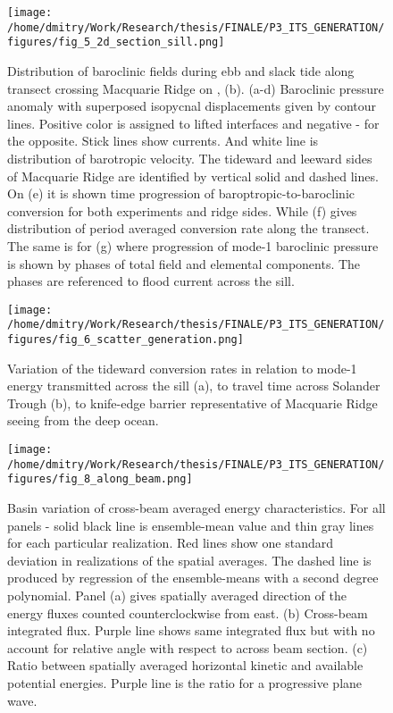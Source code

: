 \documentclass[12pt]{article}
\begin{document}
\begin{figure}
	\centering
	\texttt{[image: /home/dmitry/Work/Research/thesis/FINALE/P3\_ITS\_GENERATION/figures/fig\_5\_2d\_section\_sill.png]}
	\caption{Distribution of baroclinic fields during ebb and slack tide along transect crossing 
	Macquarie Ridge on , (b). (a-d) Baroclinic pressure anomaly with superposed 
	isopycnal displacements given by contour lines. Positive color is assigned to lifted interfaces 
	and negative - for the opposite. Stick lines show currents. And white line is distribution 
	of barotropic velocity. The tideward and leeward sides of Macquarie Ridge are identified by 
	vertical solid and dashed lines. On (e) it is shown time progression of 
	baroptropic-to-baroclinic conversion for both experiments and ridge sides. While (f) gives 
	distribution of period averaged conversion rate along the transect. The same is for (g) where 
	progression of mode-1 baroclinic pressure is shown by phases of total field and elemental 
	components. The phases are referenced to flood current across the sill.}
	\label{C3.fig:gen_2d}
\end{figure}

\begin{figure}
	\centering
	\texttt{[image: /home/dmitry/Work/Research/thesis/FINALE/P3\_ITS\_GENERATION/figures/fig\_6\_scatter\_generation.png]}
	\caption{Variation of the tideward conversion rates in relation to mode-1 energy transmitted 
	across the sill (a), to travel time across Solander Trough (b), to knife-edge barrier 
	representative of Macquarie Ridge seeing from the deep ocean.}
	\label{C3.fig:gen_regr}
\end{figure}

\begin{figure}
	\centering
	\texttt{[image: /home/dmitry/Work/Research/thesis/FINALE/P3\_ITS\_GENERATION/figures/fig\_8\_along\_beam.png]}
	\caption{Basin variation of cross-beam averaged energy characteristics. For all panels - solid 
	black line is ensemble-mean value and thin gray lines for each particular realization. Red 
	lines show one standard deviation in realizations of the spatial averages. The dashed line is 
	produced by regression of the ensemble-means with a second degree polynomial. Panel (a) gives 
	spatially averaged direction of the energy fluxes counted counterclockwise from east. (b) 
	Cross-beam integrated flux. Purple line shows same integrated flux but with no account for 
	relative angle with respect to across beam section. (c) Ratio between spatially averaged 
	horizontal kinetic and available potential energies. Purple line is the ratio for a progressive 
	plane wave.}
	\label{C3.fig:beam_prms}
\end{figure}
\end{document}

